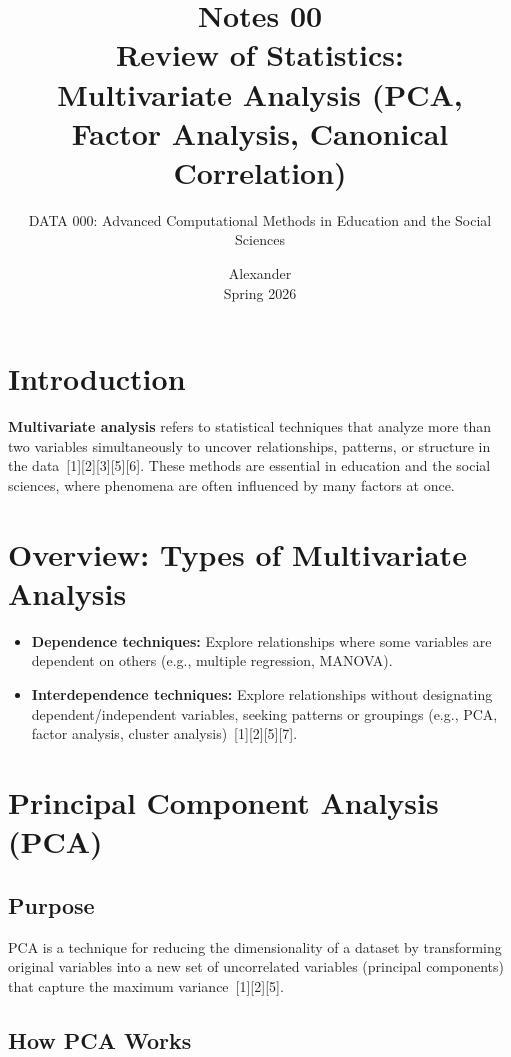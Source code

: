 \documentclass[11pt]{article}
\title{Notes 00 \\ Review of Statistics: \\ Multivariate Analysis (PCA, Factor Analysis, Canonical Correlation)}
\author{DATA 000: Advanced Computational Methods in Education and the Social Sciences}
\date{Alexander \\ Spring 2026}
\begin{document}
\maketitle

\tableofcontents

\section{Introduction}

\textbf{Multivariate analysis} refers to statistical techniques that analyze more than two variables simultaneously to uncover relationships, patterns, or structure in the data\ [1][2][3][5][6]. These methods are essential in education and the social sciences, where phenomena are often influenced by many factors at once.

\section{Overview: Types of Multivariate Analysis}

\begin{itemize}
    \item \textbf{Dependence techniques:} Explore relationships where some variables are dependent on others (e.g., multiple regression, MANOVA).
    \item \textbf{Interdependence techniques:} Explore relationships without designating dependent/independent variables, seeking patterns or groupings (e.g., PCA, factor analysis, cluster analysis)\ [1][2][5][7].
\end{itemize}

\section{Principal Component Analysis (PCA)}

\subsection{Purpose}

PCA is a technique for reducing the dimensionality of a dataset by transforming original variables into a new set of uncorrelated variables (principal components) that capture the maximum variance\ [1][2][5].

\subsection{How PCA Works}
\end{document}
